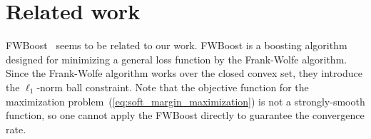 \section{Related work}
\label{sec:related_work}
FWBoost~\citep{wang+:arxiv15} seems to be related to our work.
FWBoost is a boosting algorithm designed for 
minimizing a general loss function by the Frank-Wolfe algorithm. 
Since the Frank-Wolfe algorithm works over the closed convex set, 
they introduce the $\ell_1$-norm ball constraint. 
Note that the objective function for 
the maximization problem~(\ref{eq:soft_margin_maximization}) is 
not a strongly-smooth function, so 
one cannot apply the FWBoost directly to guarantee the convergence rate. 

